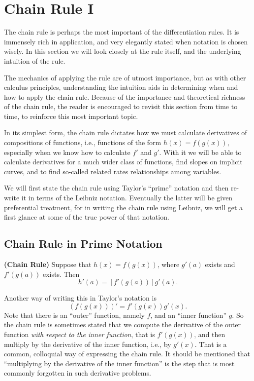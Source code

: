 \section{Chain Rule I}
The chain rule is perhaps the most important of the 
differentiation rules.  It is immensely rich in application,
and very elegantly stated when notation is chosen wisely.
In this section we will look closely at the rule itself,
and the underlying intuition of the rule. 


 The mechanics
of applying the rule are of utmost importance, but as with
other calculus principles, understanding the intuition
aids in determining when and how to apply the chain rule.
Because of the importance and theoretical richness of the
chain rule, the reader is encouraged to revisit this
section from time to time, to reinforce this 
most important topic.



In its simplest form, the chain rule dictates  how 
we must calculate derivatives of compositions
of functions, i.e., functions of the form $h(x)=f(g(x))$, 
especially when
we know how to calculate $f'$ and  $g'$.  
With it we will be
able to calculate derivatives for a much
wider class of functions,  find slopes on
implicit curves, and to find so-called related rates
relationships among variables.  

We will first state 
the chain rule using Taylor's ``prime'' notation 
and  then  re-write it in terms
of the Leibniz notation.  Eventually the latter will be given 
preferential treatment, for in writing the chain rule
using Leibniz, we will get a first glance at some of the true
power of that notation.
\subsection{Chain Rule in Prime Notation}
\begin{theorem}{\rm\bf(Chain Rule)} 
Suppose that $h(x)=f(g(x))$, where $g'(a)$ exists and
$f'(g(a))$ exists.  Then
\begin{equation}
h'(a)=[f'(g(a))]g'(a).
\end{equation}
\end{theorem}
%
Another way of writing this in Taylor's notation is
\begin{equation}\left(f(g(x))\right)'=f'(g(x))g'(x).
\label{PrimeNotationChainRule}\end{equation}
Note that there is an ``outer'' function, namely $f$,
and an ``inner function'' $g$.  So the chain rule
is sometimes stated that we compute the derivative
of the outer function {\it with respect to the inner function},
that is $f'(g(x))$, and then multiply by the derivative of
the inner function, i.e., by $g'(x)$.  That is a common, 
colloquial way of expressing the chain rule.  It should be
mentioned that ``multiplying by the derivative of the inner
function'' is the step that is most commonly forgotten
in such derivative problems.

